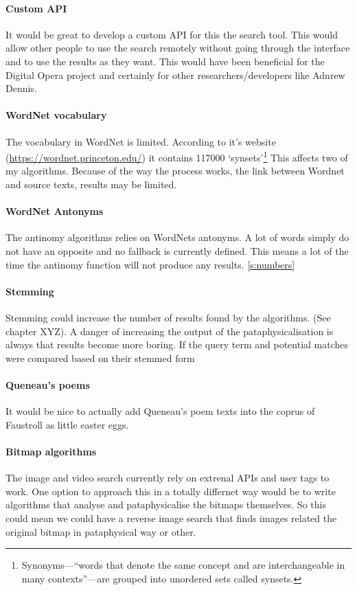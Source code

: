 \paragraph{Custom API}
It would be great to develop a custom \ac{API} for this the search tool. This would allow other people to use the search remotely without going through the interface and to use the results as they want. This would have been beneficial for the Digital Opera project and certainly for other researchers/developers like Adnrew Dennis.

\paragraph{WordNet vocabulary}
The vocabulary in WordNet is limited. According to it's website (\url{https://wordnet.princeton.edu/}) it contains 117000 `synsets'\footnote{Synonyms---``words that denote the same concept and are interchangeable in many contexts''---are grouped into unordered sets called synsets.} This affects two of my algorithms. Because of the way the process works, the link between Wordnet and source texts, results may be limited. 

\paragraph{WordNet Antonyms}
The antinomy algorithms relies on WordNets antonyms. A lot of words simply do not have an opposite and no fallback is currently defined. This means a lot of the time the antinomy function will not produce any results.
\ref{s:numbers}

\paragraph{Stemming}
Stemming could increase the number of results found by the algorithms. (See chapter XYZ). A danger of increasing the output of the pataphysicalisation is always that results become more boring. If the query term and potential matches were compared based on their stemmed form 
 
\paragraph{Queneau's poems}
It would be nice to actually add Queneau's poem texts into the coprus of Faustroll as little easter eggs.

\paragraph{Bitmap algorithms}
The image and video search currently rely on extrenal \ac{API}s and user tags to work. One option to approach this in a totally differnet way would be to write algorithms that analyse and pataphysicalise the bitmaps themselves. So this could mean we could have a reverse image search that finds images related the original bitmap in pataphysical way or other.

